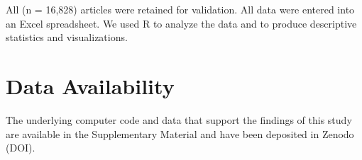 \documentclass[12pt]{article}
\begin{document}
All (n = 16,828) articles were retained for validation. All data were
entered into an Excel spreadsheet. We used R to analyze the data and to
produce descriptive statistics and visualizations.

\hypertarget{data-availability}{%
\section{Data Availability}\label{data-availability}}

The underlying computer code and data that support the findings of this
study are available in the Supplementary Material and have been
deposited in Zenodo (DOI).



\end{document}
